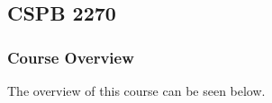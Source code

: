 \clearpage

\renewcommand{\ChapTitle}{\CSPBDataStruct}
\renewcommand{\SectionTitle}{CSPB 2270}

\chapter{\ChapTitle}
\section{\SectionTitle}

\subsection{Course Overview}

The overview of this course can be seen below.

